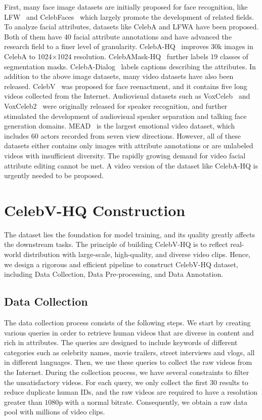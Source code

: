 First, many face image datasets are initially proposed for face recognition, like LFW~\cite{LFW} and CelebFaces~\cite{celebfaces} which largely promote the development of related fields. To analyze facial attributes, datasets like CelebA and LFWA \cite{celeba15} have been proposed. Both of them have 40 facial attribute annotations and have advanced the research field to a finer level of granularity. CelebA-HQ~\cite{celebahq} improves 30k images in CelebA to 1024$\times$1024 resolution. CelebAMask-HQ~\cite{celebahq_mask} further labels 19 classes of segmentation masks. CelebA-Dialog~\cite{celeba_dialog} labels captions describing the attributes. In addition to the above image datasets, many video datasets have also been released. CelebV~\cite{wayne2018reenactgan} was proposed for face reenactment, and it contains five long videos collected from the Internet. Audiovisual datasets such as VoxCeleb~\cite{vox17} and VoxCeleb2~\cite{vox2} were originally released for speaker recognition, and further stimulated the development of audiovisual speaker separation and talking face generation domains. MEAD~\cite{mead} is the largest emotional video dataset, which includes 60 actors recorded from seven view directions. However, all of these datasets either contains only images with attribute annotations or are unlabeled videos with insufficient diversity. The rapidly growing demand for video facial attribute editing cannot be met. A video version of the dataset like CelebA-HQ \cite{celebahq} is urgently needed to be proposed. 

\section{CelebV-HQ Construction} The dataset lies the foundation for model training, and its quality greatly affects the downstream tasks. The principle of building CelebV-HQ is to reflect real-world distribution with large-scale, high-quality, and diverse video clips. Hence, we design a rigorous and efficient pipeline to construct CelebV-HQ dataset, including Data Collection, Data Pre-processing, and Data Annotation.

\subsection{Data Collection}

The data collection process consists of the following steps. We start by creating various queries in order to retrieve human videos that are diverse in content and rich in attributes. The queries are designed to include keywords of different categories such as celebrity names, movie trailers, street interviews and vlogs, all in different languages. Then, we use these queries to collect the raw videos from the Internet. During the collection process, we have several constraints to filter the unsatisfactory videos. For each query, we only collect the first $30$ results to reduce duplicate human IDs, and the raw videos are required to have a resolution greater than $1080$p with a normal bitrate. Consequently, we obtain a raw data pool with millions of video clips.

